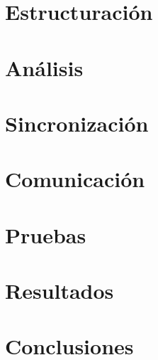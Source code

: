 \documentclass[11pt,letterpaper,oneside]{phstylee}
\begin{document}
\chapter{Estructuración}
\label{cap:structure}


\newpage
\thispagestyle{empty}
\cleardoublepage


\chapter{Análisis}
\label{cap:analysis}


\newpage
\thispagestyle{empty}
\cleardoublepage

\chapter{Sincronización}
\label{cap:sync}


\newpage
\thispagestyle{empty}
\cleardoublepage

\chapter{Comunicación}
\label{cap:comm}


\newpage
\thispagestyle{empty}
\cleardoublepage

\chapter{Pruebas}
\label{cap:test}


\newpage
\thispagestyle{empty}
\cleardoublepage

\chapter{Resultados}
\label{cap:insights}


\newpage
\thispagestyle{empty}
\cleardoublepage

\chapter{Conclusiones}
\label{cap:conclusiones}


\newpage
\thispagestyle{empty}
\cleardoublepage


\end{document}
